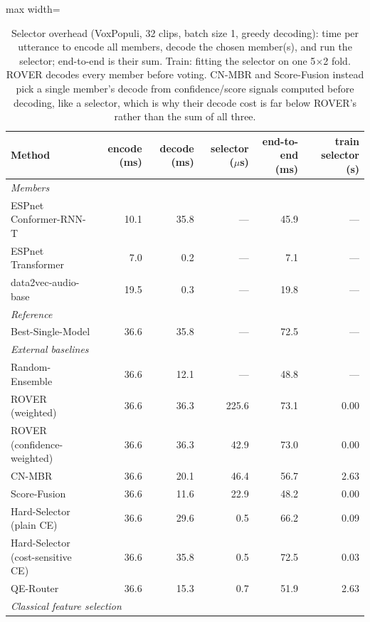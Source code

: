 \begin{table}[t]
    \centering
    \caption{Selector overhead (VoxPopuli, 32 clips, batch size 1, greedy decoding): time per utterance to encode all members, decode the chosen member(s), and run the selector; end-to-end is their sum. Train: fitting the selector on one 5$\times$2 fold. ROVER decodes every member before voting. CN-MBR and Score-Fusion instead pick a single member's decode from confidence/score signals computed before decoding, like a selector, which is why their decode cost is far below ROVER's rather than the sum of all three.}
    \label{tab:overhead_voxpopuli} \footnotesize \setlength{\tabcolsep}{3pt}
    \begin{adjustbox}{max width=\linewidth}
    \begin{tabular}{lrrrrr}
        \toprule
        \textbf{Method} & \textbf{encode (ms)} & \textbf{decode (ms)} & \textbf{selector ($\mu$s)} & \textbf{end-to-end (ms)} & \textbf{train selector (s)} \\
        \midrule
        \multicolumn{6}{l}{\textit{Members}} \\
        ESPnet Conformer-RNN-T & 10.1 & 35.8 & --- & 45.9 & --- \\
        ESPnet Transformer & 7.0 & 0.2 & --- & 7.1 & --- \\
        data2vec-audio-base & 19.5 & 0.3 & --- & 19.8 & --- \\
        \midrule \multicolumn{6}{l}{\textit{Reference}} \\
        Best-Single-Model & 36.6 & 35.8 & --- & 72.5 & --- \\
        \midrule \multicolumn{6}{l}{\textit{External baselines}} \\
        Random-Ensemble & 36.6 & 12.1 & --- & 48.8 & --- \\
        ROVER (weighted) & 36.6 & 36.3 & 225.6 & 73.1 & 0.00 \\
        ROVER (confidence-weighted) & 36.6 & 36.3 & 42.9 & 73.0 & 0.00 \\
        CN-MBR & 36.6 & 20.1 & 46.4 & 56.7 & 2.63 \\
        Score-Fusion & 36.6 & 11.6 & 22.9 & 48.2 & 0.00 \\
        Hard-Selector (plain CE) & 36.6 & 29.6 & 0.5 & 66.2 & 0.09 \\
        Hard-Selector (cost-sensitive CE) & 36.6 & 35.8 & 0.5 & 72.5 & 0.03 \\
        QE-Router & 36.6 & 15.3 & 0.7 & 51.9 & 2.63 \\
        \midrule \multicolumn{6}{l}{\textit{Classical feature selection}} \\

\end{tabular}
\end{adjustbox}
\end{table}

